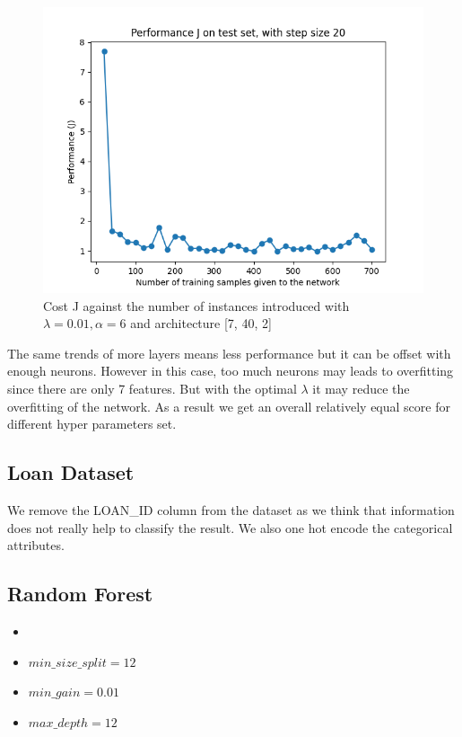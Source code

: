 \documentclass[letterpaper]{article}
\begin{document}
\begin{figure}[H]
	\includegraphics[width=\textwidth]{figures/nn_titanic.csv_cost.png}
	\caption{Cost J against the number of instances introduced with $\lambda=0.01, \alpha=6$ and architecture [7, 40, 2]}
	\label{fig:nn-titanic}
\end{figure}

The same trends of more layers means less performance but it can be offset with enough neurons. However in this case, too much neurons
may leads to overfitting since there are only 7 features. But with the optimal $\lambda$ it may reduce the overfitting of the network.
As a result we get an overall relatively equal score for different hyper parameters set.

\subsection{Loan Dataset}

We remove the LOAN\_ID column from the dataset as we think that information does not really help to classify the result. We also one hot encode the categorical
attributes.

\subsection*{Random Forest}
\begin{itemize}
	\item {}
	\item $min\_size\_split = 12$
	\item $min\_gain = 0.01$
	\item $max\_depth = 12$
\end{itemize}
\end{document}
